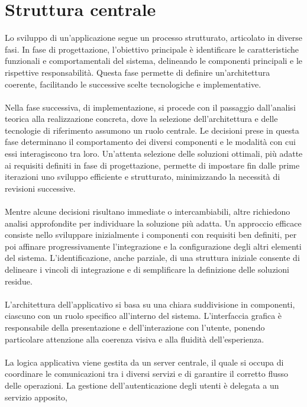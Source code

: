 \section{Struttura centrale}

Lo sviluppo di un’applicazione segue un processo strutturato, articolato in diverse fasi. In fase di progettazione,
l'obiettivo principale è identificare le caratteristiche funzionali e comportamentali del sistema, delineando le componenti principali e le rispettive responsabilità.
Questa fase permette di definire un'architettura coerente, facilitando le successive scelte tecnologiche e implementative.\\
\\
Nella fase successiva, di implementazione, si procede con il passaggio dall’analisi teorica alla realizzazione concreta,
dove la selezione dell’architettura e delle tecnologie di riferimento assumono un ruolo centrale.
Le decisioni prese in questa fase determinano il comportamento dei diversi componenti e le modalità con cui essi interagiscono tra loro.
Un’attenta selezione delle soluzioni ottimali, più adatte ai requisiti definiti in fase di progettazione,
permette di impostare fin dalle prime iterazioni uno sviluppo efficiente e strutturato, minimizzando la necessità di revisioni successive.\\
\\
Mentre alcune decisioni risultano immediate o intercambiabili, altre richiedono analisi approfondite per individuare la soluzione più adatta.
Un approccio efficace consiste nello sviluppare inizialmente i componenti con requisiti ben definiti,
per poi affinare progressivamente l'integrazione e la configurazione degli altri elementi del sistema.
L'identificazione, anche parziale, di una struttura iniziale consente di delineare i vincoli di integrazione e di semplificare la definizione delle soluzioni residue.\\
\\
L’architettura dell’applicativo si basa su una chiara suddivisione in componenti, ciascuno con un ruolo specifico all’interno del sistema.
L'interfaccia grafica è responsabile della presentazione e dell’interazione con l’utente, ponendo particolare attenzione alla coerenza visiva e alla fluidità dell’esperienza.\\
\\
La logica applicativa viene gestita da un server centrale, il quale si occupa di coordinare le comunicazioni tra i diversi servizi e di garantire il corretto flusso delle operazioni.
La gestione dell’autenticazione degli utenti è delegata a un servizio apposito,
